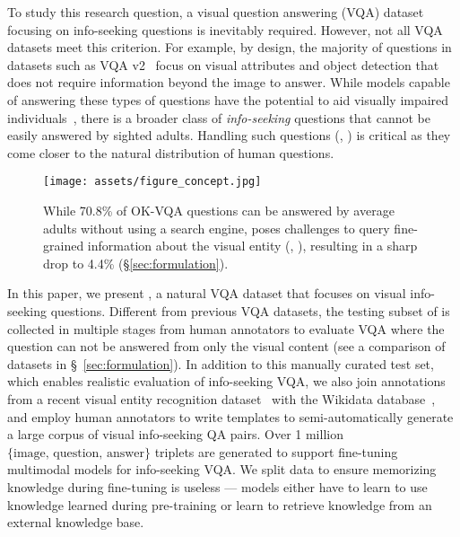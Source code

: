 \documentclass[11pt]{article}
\begin{document}
To study this research question, a visual question answering (VQA) dataset focusing on info-seeking questions is inevitably required. However, not all VQA datasets meet this criterion. For example, 
by design, the majority of questions in 
datasets such as VQA v2~\cite{balanced_vqa_v2} focus on visual attributes and object detection that does not require information beyond the image to answer.
While models capable of answering these types of questions have the potential to aid visually impaired individuals~\cite{gurari2018vizwiz}, there is a broader class of {\em info-seeking} questions that cannot be easily answered by sighted adults. Handling such questions (\eg, ) is critical as they come closer to the natural distribution of human questions. 

\begin{figure}[t]
    \centering
    \texttt{[image: assets/figure\_concept.jpg]}
\caption{
        While 70.8\% of OK-VQA questions can be answered by average adults without using a search engine, \ourdataset poses challenges to query fine-grained information about the visual entity (\eg, ), resulting in a sharp drop to 4.4\% (\S\ref{sec:formulation}).
    }
\label{fig:intro_example}
\end{figure} 
In this paper, we present \infoseek, a natural VQA dataset that focuses on visual {info-seeking} questions. 
Different from previous VQA datasets, the testing subset of \ourdataset is collected in multiple stages from human annotators to evaluate VQA where the question can not be answered from only the visual content (see a comparison of datasets in \S~\ref{sec:formulation}).
In addition to this manually curated test set, which enables realistic evaluation of info-seeking VQA, we also join annotations from a recent visual entity recognition dataset~\cite{hu2023opendomain} with the Wikidata database~\cite{vrandevcic2014wikidata}, and employ human annotators to write templates to semi-automatically generate a large corpus of visual info-seeking QA pairs. 
Over 1 million $\{\text{image, question, answer}\}$ triplets are generated to support fine-tuning multimodal models for info-seeking VQA. We split data to ensure memorizing knowledge during fine-tuning is useless --- models either have to learn to use knowledge learned during pre-training or learn to retrieve knowledge from an external knowledge base.
\end{document}
